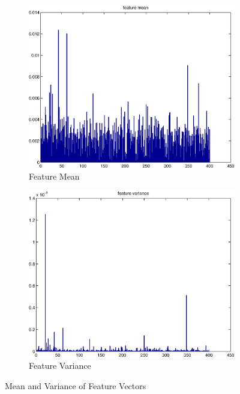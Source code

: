\documentclass[a4paper, 11pt]{article}
\begin{document}
\begin{figure}[H]
\centering
\begin{subfigure}{.4\textwidth}
  \centering
  \includegraphics[scale=0.35]{project2/feature-mean.eps}
  \caption{Feature Mean}
  \label{fig:sub1}
\end{subfigure}%
\begin{subfigure}{.4\textwidth}
  \centering
  \includegraphics[scale=0.35]{project2/feature-variance.eps}
  \caption{Feature Variance}
  \label{fig:sub2}
\end{subfigure}
\caption{Mean and Variance of Feature Vectors}
\label{fig:mean-var}
\end{figure}
\end{document}
